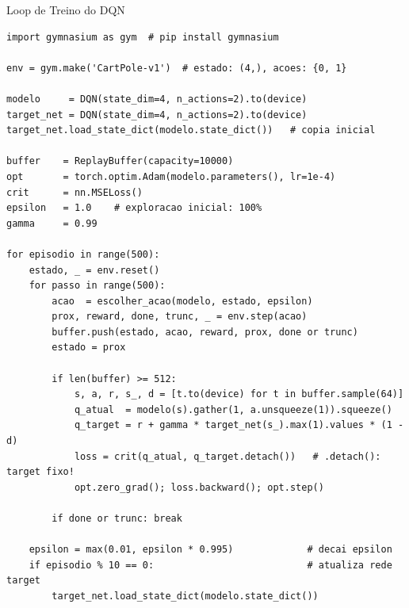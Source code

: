 \documentclass[aspectratio=169, 10pt]{beamer}
\begin{document}

\begin{frame}[fragile]{Loop de Treino do DQN}
\begin{lstlisting}[style=small]
import gymnasium as gym  # pip install gymnasium

env = gym.make('CartPole-v1')  # estado: (4,), acoes: {0, 1}

modelo     = DQN(state_dim=4, n_actions=2).to(device)
target_net = DQN(state_dim=4, n_actions=2).to(device)
target_net.load_state_dict(modelo.state_dict())   # copia inicial

buffer    = ReplayBuffer(capacity=10000)
opt       = torch.optim.Adam(modelo.parameters(), lr=1e-4)
crit      = nn.MSELoss()
epsilon   = 1.0    # exploracao inicial: 100%
gamma     = 0.99

for episodio in range(500):
    estado, _ = env.reset()
    for passo in range(500):
        acao  = escolher_acao(modelo, estado, epsilon)
        prox, reward, done, trunc, _ = env.step(acao)
        buffer.push(estado, acao, reward, prox, done or trunc)
        estado = prox

        if len(buffer) >= 512:
            s, a, r, s_, d = [t.to(device) for t in buffer.sample(64)]
            q_atual  = modelo(s).gather(1, a.unsqueeze(1)).squeeze()
            q_target = r + gamma * target_net(s_).max(1).values * (1 - d)
            loss = crit(q_atual, q_target.detach())   # .detach(): target fixo!
            opt.zero_grad(); loss.backward(); opt.step()

        if done or trunc: break

    epsilon = max(0.01, epsilon * 0.995)             # decai epsilon
    if episodio % 10 == 0:                           # atualiza rede target
        target_net.load_state_dict(modelo.state_dict())
\end{lstlisting}
\end{frame}

\end{document}
